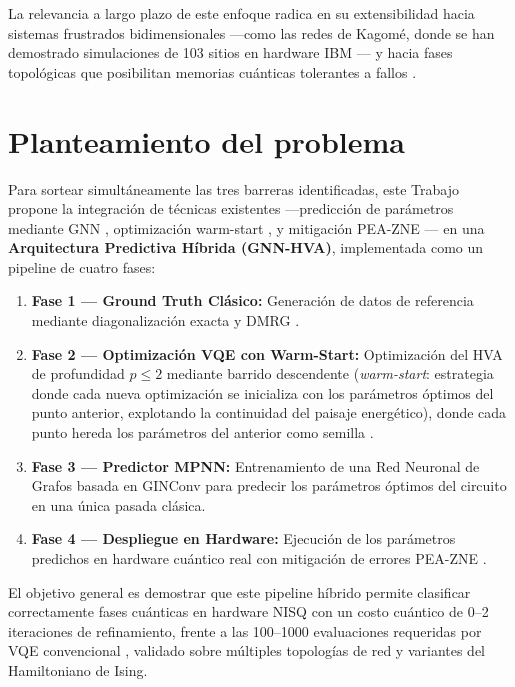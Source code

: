 \documentclass[11pt,a4paper,spanish]{book}
\begin{document}
La relevancia a largo plazo de este enfoque radica en su extensibilidad hacia sistemas frustrados bidimensionales ---como las redes de Kagomé, donde se han demostrado simulaciones de 103 sitios en hardware IBM \citep{ahsan2025}--- y hacia fases topológicas que posibilitan memorias cuánticas tolerantes a fallos \citep{savary2016}.

\section{Planteamiento del problema}

Para sortear simultáneamente las tres barreras identificadas, este Trabajo propone la integración de técnicas existentes ---predicción de parámetros mediante GNN \citep{miao2024, zhang2025}, optimización warm-start \citep{puig2025}, y mitigación PEA-ZNE \citep{kim2023}--- en una \textbf{Arquitectura Predictiva Híbrida (GNN-HVA)}, implementada como un pipeline de cuatro fases:

\begin{enumerate}
    \item \textbf{Fase 1 --- Ground Truth Clásico:} Generación de datos de referencia mediante diagonalización exacta y DMRG \citep{schollwock2011}.

    \item \textbf{Fase 2 --- Optimización VQE con Warm-Start:} Optimización del HVA de profundidad $p \leq 2$ mediante barrido descendente (\emph{warm-start}: estrategia donde cada nueva optimización se inicializa con los parámetros óptimos del punto anterior, explotando la continuidad del paisaje energético), donde cada punto hereda los parámetros del anterior como semilla \citep{puig2025, mele2022}.

    \item \textbf{Fase 3 --- Predictor MPNN:} Entrenamiento de una Red Neuronal de Grafos basada en GINConv \citep{xu2019} para predecir los parámetros óptimos del circuito en una única pasada clásica.

    \item \textbf{Fase 4 --- Despliegue en Hardware:} Ejecución de los parámetros predichos en hardware cuántico real con mitigación de errores PEA-ZNE \citep{kim2023, uvarov2024}.
\end{enumerate}

El objetivo general es demostrar que este pipeline híbrido permite clasificar correctamente fases cuánticas en hardware NISQ con un costo cuántico de 0--2 iteraciones de refinamiento, frente a las 100--1000 evaluaciones requeridas por VQE convencional \citep{tilly2022}, validado sobre múltiples topologías de red y variantes del Hamiltoniano de Ising.
\end{document}
